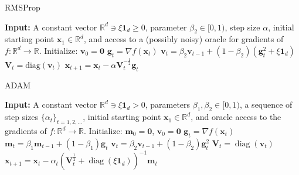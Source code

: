 \begin{algorithm}
    \caption{RMSProp}
    \label{alg:rmsprop}
    \begin{algorithmic}[1]
        \State \textbf{Input:} A constant vector $\mathbb{R}^d \ni \xi \mathbf{1}_d \geq 0$, parameter $\beta_2 \in [0, 1)$, step size $\alpha$, initial starting point $\mathbf{x}_1 \in \mathbb{R}^d$, and access to a (possibly noisy) oracle for gradients of $f : \mathbb{R}^d \rightarrow \mathbb{R}$.
            \State Initialize: $\mathbf{v}_0 = \mathbf{0}$
                \State $\mathbf{g}_t = \nabla f(\mathbf{x}_t)$
                \State $\mathbf{v}_t = \beta_2 \mathbf{v}_{t-1} + (1 - \beta_2)(\mathbf{g}_t^2 + \xi \mathbf{1}_d)$
                \State $\mathbf{V}_t = \text{diag}(\mathbf{v}_t)$
                \State $\mathbf{x}_{t+1} = \mathbf{x}_t - \alpha \mathbf{V}_t^{-\frac{1}{2}} \mathbf{g}_t$
            \EndFor
        \EndFunction
    \end{algorithmic}
    \end{algorithm}
    \vspace{-1cm}

\begin{algorithm}
    \caption{ADAM}
    \label{alg:adam}
    \begin{algorithmic}[1]
        \State \textbf{Input:} A constant vector $\mathbb{R}^d \ni \xi \mathbf{1}_d > 0$, parameters $\beta_1, \beta_2 \in [0, 1)$, a sequence of step sizes $\{\alpha_t\}_{t=1,2,\dots}$, initial starting point $\mathbf{x}_1 \in \mathbb{R}^d$, and oracle access to the gradients of $f : \mathbb{R}^d \to \mathbb{R}$.
            \State Initialize: $\mathbf{m}_0 = \mathbf{0}$, $\mathbf{v}_0 = \mathbf{0}$
                \State $\mathbf{g}_t = \nabla f(\mathbf{x}_t)$
                \State $\mathbf{m}_t = \beta_1 \mathbf{m}_{t-1} + (1 - \beta_1) \mathbf{g}_t$
                \State $\mathbf{v}_t = \beta_2 \mathbf{v}_{t-1} + (1 - \beta_2) \mathbf{g}_t^2$
                \State $\mathbf{V}_t = \operatorname{diag}(\mathbf{v}_t)$
                \State $\mathbf{x}_{t+1} = \mathbf{x}_t - \alpha_t \left( \mathbf{V}_t^{\frac{1}{2}} + \operatorname{diag}(\xi \mathbf{1}_d) \right)^{-1} \mathbf{m}_t$
            \EndFor
        \EndFunction
    \end{algorithmic}
    \end{algorithm}